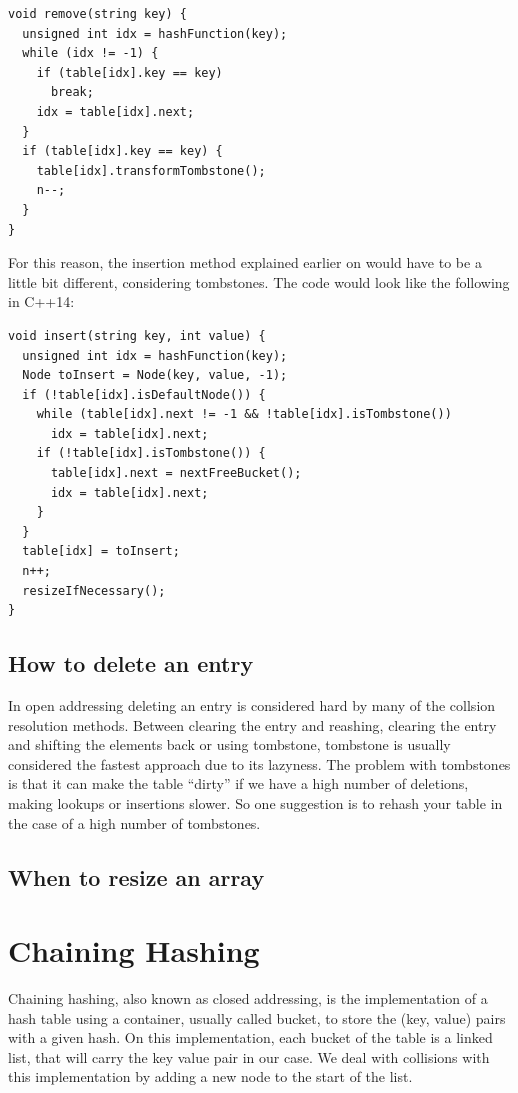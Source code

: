 \begin{lstlisting}
void remove(string key) {
  unsigned int idx = hashFunction(key);
  while (idx != -1) {
    if (table[idx].key == key) 
      break;
    idx = table[idx].next;         
  }
  if (table[idx].key == key) {
    table[idx].transformTombstone();
    n--;
  }
}
\end{lstlisting}

For this reason, the insertion method explained earlier on would have to be a little bit different, considering tombstones. The code would look like the following in C++14:

\begin{lstlisting}
void insert(string key, int value) {
  unsigned int idx = hashFunction(key);
  Node toInsert = Node(key, value, -1);
  if (!table[idx].isDefaultNode()) {
    while (table[idx].next != -1 && !table[idx].isTombstone())
      idx = table[idx].next; 
    if (!table[idx].isTombstone()) {
      table[idx].next = nextFreeBucket();
      idx = table[idx].next;
    }
  }
  table[idx] = toInsert;
  n++;
  resizeIfNecessary();
}
\end{lstlisting}

\subsection{How to delete an entry}

In open addressing deleting an entry is considered hard by many of the collsion resolution methods. Between clearing the entry and reashing, clearing the entry and shifting the elements back or using tombstone, tombstone is usually considered the fastest approach due to its lazyness.
The problem with tombstones is that it can make the table ``dirty'' if we have a high number of deletions, making lookups or insertions slower. So one suggestion is to rehash your table in the case of a high number of tombstones.



\subsection{When to resize an array}

\section{Chaining Hashing}

Chaining hashing, also known as closed addressing, is the implementation of a hash table using a container, usually called bucket, to store the (key, value) pairs with a given hash. On this implementation, each bucket of the table is a linked list, that will carry the key value pair in our case. We deal with collisions with this implementation by adding a new node to the start of the list.

